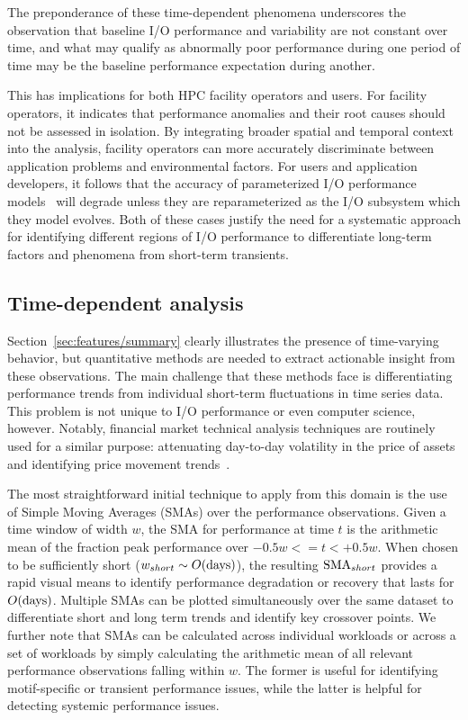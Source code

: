 The preponderance of these time-dependent phenomena underscores the observation that baseline I/O performance and variability are not constant over time, and
what may qualify as abnormally poor performance during one period of time may be the baseline performance expectation during another.

This has implications for both HPC facility operators and users.  For
facility operators, it indicates that performance anomalies and their root
causes should not be assessed in isolation. By integrating broader spatial and
temporal context into the analysis, facility operators can more accurately
discriminate between application problems and environmental factors.
For users and application developers, it follows that the accuracy of parameterized I/O performance models~\cite{Xie2012,Madireddy2017} will degrade unless they are reparameterized as the I/O subsystem which they model evolves.
Both of these cases justify the need for a systematic approach for identifying different regions of I/O performance to differentiate long-term factors and phenomena from short-term transients.

\subsection{Time-dependent analysis} \label{sec:features/timedependent}

Section~\ref{sec:features/summary} clearly illustrates the presence of
time-varying behavior, but quantitative methods are needed to extract 
actionable insight from these observations.  The main challenge that these
methods face is differentiating performance trends from individual short-term
fluctuations in time series data.
This problem is not unique to I/O performance or even computer science,
however.  Notably, financial market technical analysis techniques are
routinely used for a similar purpose: attenuating day-to-day volatility in
the price of assets and identifying price movement
trends~\cite{james1968monthly,gunasekarage2001profitability}.  

The most straightforward initial technique to apply from this domain is
the use of Simple Moving Averages (SMAs) over the performance observations.
Given a time window of width $w$, the SMA for performance at time $t$ is the arithmetic mean of the fraction peak performance over ${-0.5w <= t < +0.5w}$.
When chosen to be sufficiently short (${w_{short} \sim O(\textup{days})}$),
the resulting $\textup{SMA}_{short}$ provides a rapid visual means to
identify performance degradation or recovery that lasts for
$O(\textup{days})$.  Multiple SMAs can be plotted simultaneously over the
same dataset to differentiate short and long term trends and identify key
crossover points.
We further note that SMAs can be calculated across individual workloads or across a set of workloads by simply calculating the arithmetic mean of all relevant performance observations falling within $w$.
The former is useful for identifying motif-specific or transient performance issues, while the latter is helpful for detecting systemic performance issues.

